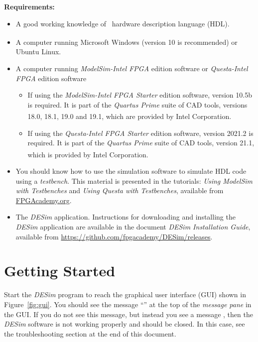 {\bf Requirements:}
\vspace{-1em}
\begin{itemize}
	\item A good working knowledge of \hdlName~hardware description language (HDL).
\item A computer running Microsoft\textsuperscript{\textregistered} Windows\textsuperscript{\textregistered} (version 10 is recommended) 
	or Ubuntu Linux.
\item A computer running {\it ModelSim-Intel FPGA} edition software or {\it Questa-Intel FPGA} edition software
\begin{itemize}
	\item If using the {\it ModelSim-Intel FPGA Starter} edition software, version 10.5b is required. It is
		part of the {\it Quartus Prime} suite of CAD tools, versions 18.0, 18.1, 19.0 and 19.1, which are
		provided by Intel\textsuperscript{\textregistered} Corporation.
	\item If using the {\it Questa-Intel FPGA Starter} edition software, version 2021.2 is required. It is
		part of the {\it Quartus Prime} suite of CAD tools, version 21.1, which is
		provided by Intel\textsuperscript{\textregistered} Corporation.
\end{itemize}
\item You should know how to use the simulation software to simulate HDL code using a {\it testbench}. 
	This material is presented in the tutorials: 
		{\it Using ModelSim with Testbenches} and 
		{\it Using Questa with Testbenches}, available from
		\href{https://www.fpgacademy.org/tutorials.html}{FPGAcademy.org}.
\item The {\it DESim} application. Instructions for downloading and installing the {\it DESim} 
application are available in the document {\it DESim Installation Guide}, available from
\url{https://github.com/fpgacademy/DESim/releases}.
\end{itemize}

\newpage

\section{Getting Started}
Start the {\it DESim} program to reach the graphical user interface (GUI) shown in 
Figure~\ref{fig:gui}. You should see the message ``'' at 
the top of the {\it message pane} in the GUI. If you do not see this message, but instead 
you see a message , then the {\it DESim} software is not working
properly and should be closed. In this case, see the troubleshooting section at the end
of this document.

